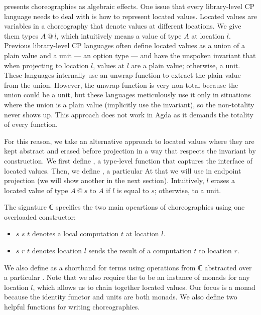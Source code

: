  presents choreographies as algebraic effects.
%
One issue that every library-level CP language needs to deal with is how to represent located values.
%
Located values are variables in a choreography that denote values at different locations.
%
We give them types $A \ @ \ l$, which intuitively means a value of type $A$ at location $l$.
%
Previous library-level CP languages often define located values as a union of a plain value and a unit --- an option type --- and have the unspoken invariant that when projecting to location $l$, values at $l$ are a plain value; otherwise, a unit.
%
These languages internally use an unwrap function to extract the plain value from the union.
%
However, the unwrap function is very non-total because the union could be a unit, but these languages meticulously use it only in situations where the union is a plain value (implicitly use the invariant), so the non-totality never shows up.
%
This approach does not work in Agda as it demands the totality of every function.

For this reason, we take an alternative approach to located values where they are kept abstract and erased before projection in a way that respects the invariant by construction.
%
We first define , a type-level function that captures the interface of located values.
%
Then, we define , a particular At that we will use in endpoint projection (we will show another  in the next section).
%
Intuitively,  $l$ erases a located value of type $A \ @ \ s$ to $A$ if $l$ is equal to $s$; otherwise, to a unit.

The signature ℂ specifies the two main opeartions of choreographies using one overloaded constructor:
%
\begin{itemize}
\item
   $s$ $s$ $t$ denotes a local computation $t$ at location $l$.
\item
   $s$ $r$ $t$ denotes location $l$ sends the result of a computation $t$ to location $r$.
\end{itemize}

We also define  as a shorthand for terms using operations from ℂ abstracted over a particular .
%
Note that we also require the  to be an instance of monads for any location $l$, which allows us to chain together located values.
%
Our focus is a monad because the identity functor and units are both monads.
%
We also define two helpful functions for writing choreographies.

